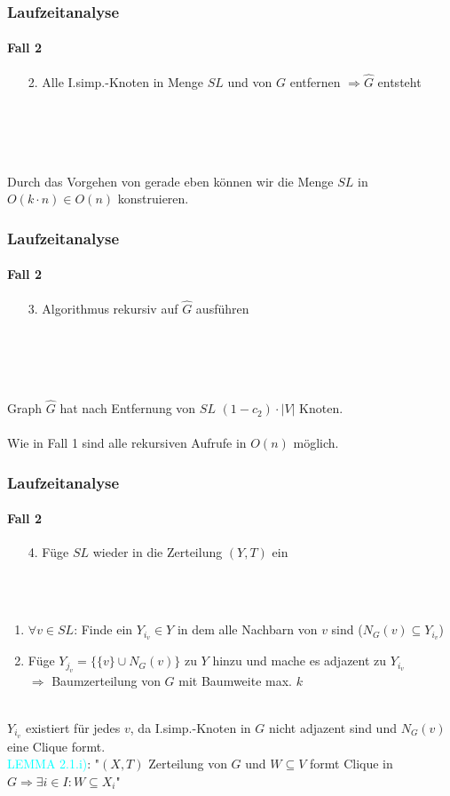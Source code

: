 \begin{frame}
\frametitle{Laufzeitanalyse}
\framesubtitle{Fall 2}

\begin{enumerate}
	\item[2.] Alle I.simp.-Knoten in Menge $SL$ und von $G$ entfernen $\Rightarrow \widehat{G}$ entsteht
\end{enumerate}
\ \\
\ \\
\ \\
\ \\
Durch das Vorgehen von gerade eben können wir die Menge $SL$ in $O(k \cdot n) \in O(n)$ konstruieren.

\end{frame}


\begin{frame}
\frametitle{Laufzeitanalyse}
\framesubtitle{Fall 2}

\begin{enumerate}
	\item[3.] Algorithmus rekursiv auf $\widehat{G}$ ausführen
\end{enumerate}
\ \\
\ \\
\ \\
\ \\
Graph $\widehat{G}$ hat nach Entfernung von $SL$ $(1 - c_2) \cdot |V|$ Knoten. \\
\ \\
Wie in Fall 1 sind alle rekursiven Aufrufe in $O(n)$ möglich. \\

\end{frame}


\begin{frame}
\frametitle{Laufzeitanalyse}
\framesubtitle{Fall 2}

\begin{enumerate}
	\item[4.] Füge $SL$ wieder in die Zerteilung $(Y,T)$ ein
\end{enumerate}
\ \\
\ \\
\begin{enumerate}
	\item $\forall v \in SL$: Finde ein $Y_{i_v} \in Y$ in dem alle Nachbarn von $v$ sind ($N_G(v) \subseteq Y_{i_v}$)
	\item Füge $Y_{j_v} = \{ \{v\} \cup N_G(v) \}$ zu $Y$ hinzu und mache es adjazent zu $Y_{i_v}$ \\
	$\Rightarrow$ Baumzerteilung von $G$ mit Baumweite max. $k$
\end{enumerate}
\ \\
$Y_{i_v}$ existiert für jedes $v$, da I.simp.-Knoten in $G$ nicht adjazent sind und $N_G(v)$ eine Clique formt. \\
\textcolor{cyan}{LEMMA 2.1.i)}: "$(X,T)$ Zerteilung von $G$ und $W \subseteq V$ formt Clique in $G \Rightarrow \exists i \in I: W \subseteq X_i$"
\end{frame}

